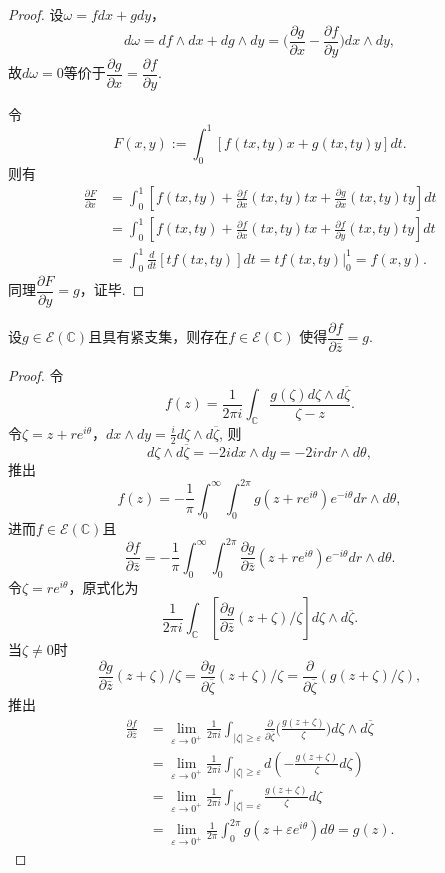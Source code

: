 \begin{proof}
	设$\omega=fdx+gdy$，
    $$d\omega=df\wedge dx+dg\wedge dy
    =\bigg(\frac{\partial g}{\partial x}-\frac{\partial f}{\partial y}\bigg)dx\wedge dy,$$
    故$d\omega=0$等价于$\dfrac{\partial g}{\partial x}=\dfrac{\partial f}{\partial y}$.

	令\[F(x,y):=\int_0^1 [f(tx,ty)x+g(tx,ty)y] dt.\]
    则有
	\begin{align*}
		\frac{\partial F}{\partial x}
        &=\int_0^1 [f(tx,ty)+\frac{\partial f}{\partial x}(tx,ty)tx
        +\frac{\partial g}{\partial x}(tx,ty)ty] dt\\
		&=\int_0^1 [f(tx,ty)+\frac{\partial f}{\partial x}(tx,ty)tx
        +\frac{\partial f}{\partial y}(tx,ty)ty] dt\\
		&=\int_0^1 \frac{d}{dt}[tf(tx,ty)] dt=tf(tx,ty)|_0^1=f(x,y).
	\end{align*}
	同理$\dfrac{\partial F}{\partial y}=g$，证毕.
\end{proof}
		

\begin{proposition}
	设$g\in \mathcal{E}(\mathbb{C})$且具有紧支集，则存在$f\in \mathcal{E}(\mathbb{C})$
    使得$\dfrac{\partial f}{\partial \bar{z}}=g$.
\end{proposition}
\begin{proof}
	令
    $$f(z)=\frac{1}{2\pi i}\int_\mathbb{C} \frac{g(\zeta)d\zeta\wedge d\overline{\zeta}}{\zeta-z}.$$ 
    令$\zeta=z+re^{i\theta}$，$dx\wedge dy=\frac{i}{2}d\zeta\wedge d\overline{\zeta}$, 则
	$$d\zeta\wedge d\overline{\zeta}=-2i dx\wedge dy=-2ir dr\wedge d\theta,$$
	推出	
	$$f(z)=-\frac{1}{\pi}\int_0^\infty\int_0^{2\pi} g(z+re^{i\theta})e^{-i\theta}dr\wedge d\theta,$$
	进而$f\in \mathcal{E}(\mathbb{C})$且
	$$\frac{\partial f}{\partial \bar{z}}
    =-\frac{1}{\pi}\int_0^\infty\int_0^{2\pi} 
    \frac{\partial g}{\partial \bar{z}}(z+re^{i\theta})e^{-i\theta}dr\wedge d\theta.$$
	令$\zeta=re^{i\theta}$，原式化为
	$$\frac{1}{2\pi i}\int_\mathbb{C} \left[\frac{\partial g}{\partial \bar{z}}(z+\zeta)/\zeta\right] d\zeta\wedge d\overline{\zeta}.$$
	当$\zeta\neq 0$时
	$$\frac{\partial g}{\partial \bar{z}}(z+\zeta)/\zeta
    =\frac{\partial g}{\partial \overline{\zeta}}(z+\zeta)/\zeta
    =\frac{\partial}{\partial \overline{\zeta}}(g(z+\zeta)/\zeta),$$
	推出
	\begin{align*}
		\frac{\partial f}{\partial \bar{z}}
        &=\lim_{\varepsilon \to 0^+} \frac{1}{2\pi i} 
        \int_{|\zeta|\geq \varepsilon} \frac{\partial }{\partial \overline{\zeta}} 
        \bigg(\frac{g(z+\zeta)}{\zeta}\bigg)d\zeta\wedge d\overline{\zeta}\\
		&=\lim_{\varepsilon \to 0^+} \frac{1}{2\pi i} 
        \int_{|\zeta|\geq \varepsilon} d\left(-\frac{g(z+\zeta)}{\zeta} d\zeta\right)\\
		&=\lim_{\varepsilon \to 0^+} \frac{1}{2\pi i} 
        \int_{|\zeta|=\varepsilon}\frac{g(z+\zeta)}{\zeta}d\zeta\\
		&=\lim_{\varepsilon \to 0^+} \frac{1}{2\pi} 
        \int_0^{2\pi} g(z+\varepsilon e^{i\theta}) d\theta=g(z).
    \end{align*}
\end{proof}
		
